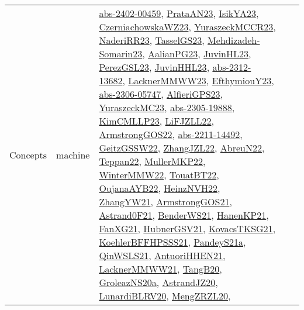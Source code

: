 {\begin{longtable}{lp{3cm}>{\raggedright}p{6cm}>{\raggedright}p{6cm}p{8cm}}
Concepts & machine & \href{articles/abs-2402-00459.pdf}{abs-2402-00459}\cite{abs-2402-00459}, \href{articles/PrataAN23.pdf}{PrataAN23}\cite{PrataAN23}, \href{articles/IsikYA23.pdf}{IsikYA23}\cite{IsikYA23}, \href{articles/CzerniachowskaWZ23.pdf}{CzerniachowskaWZ23}\cite{CzerniachowskaWZ23}, \href{articles/YuraszeckMCCR23.pdf}{YuraszeckMCCR23}\cite{YuraszeckMCCR23}, \href{articles/NaderiRR23.pdf}{NaderiRR23}\cite{NaderiRR23}, \href{papers/TasselGS23.pdf}{TasselGS23}\cite{TasselGS23}, \href{papers/Mehdizadeh-Somarin23.pdf}{Mehdizadeh-Somarin23}\cite{Mehdizadeh-Somarin23}, \href{papers/AalianPG23.pdf}{AalianPG23}\cite{AalianPG23}, \href{papers/JuvinHL23.pdf}{JuvinHL23}\cite{JuvinHL23}, \href{papers/PerezGSL23.pdf}{PerezGSL23}\cite{PerezGSL23}, \href{papers/JuvinHHL23.pdf}{JuvinHHL23}\cite{JuvinHHL23}, \href{articles/abs-2312-13682.pdf}{abs-2312-13682}\cite{abs-2312-13682}, \href{articles/LacknerMMWW23.pdf}{LacknerMMWW23}\cite{LacknerMMWW23}, \href{papers/EfthymiouY23.pdf}{EfthymiouY23}\cite{EfthymiouY23}, \href{articles/abs-2306-05747.pdf}{abs-2306-05747}\cite{abs-2306-05747}, \href{articles/AlfieriGPS23.pdf}{AlfieriGPS23}\cite{AlfieriGPS23}, \href{papers/YuraszeckMC23.pdf}{YuraszeckMC23}\cite{YuraszeckMC23}, \href{articles/abs-2305-19888.pdf}{abs-2305-19888}\cite{abs-2305-19888}, \href{papers/KimCMLLP23.pdf}{KimCMLLP23}\cite{KimCMLLP23}, \href{papers/LiFJZLL22.pdf}{LiFJZLL22}\cite{LiFJZLL22}, \href{papers/ArmstrongGOS22.pdf}{ArmstrongGOS22}\cite{ArmstrongGOS22}, \href{articles/abs-2211-14492.pdf}{abs-2211-14492}\cite{abs-2211-14492}, \href{papers/GeitzGSSW22.pdf}{GeitzGSSW22}\cite{GeitzGSSW22}, \href{papers/ZhangJZL22.pdf}{ZhangJZL22}\cite{ZhangJZL22}, \href{articles/AbreuN22.pdf}{AbreuN22}\cite{AbreuN22}, \href{papers/Teppan22.pdf}{Teppan22}\cite{Teppan22}, \href{articles/MullerMKP22.pdf}{MullerMKP22}\cite{MullerMKP22}, \href{papers/WinterMMW22.pdf}{WinterMMW22}\cite{WinterMMW22}, \href{papers/TouatBT22.pdf}{TouatBT22}\cite{TouatBT22}, \href{papers/OujanaAYB22.pdf}{OujanaAYB22}\cite{OujanaAYB22}, \href{articles/HeinzNVH22.pdf}{HeinzNVH22}\cite{HeinzNVH22}, \href{articles/ZhangYW21.pdf}{ZhangYW21}\cite{ZhangYW21}, \href{papers/ArmstrongGOS21.pdf}{ArmstrongGOS21}\cite{ArmstrongGOS21}, \href{papers/Astrand0F21.pdf}{Astrand0F21}\cite{Astrand0F21}, \href{papers/BenderWS21.pdf}{BenderWS21}\cite{BenderWS21}, \href{papers/HanenKP21.pdf}{HanenKP21}\cite{HanenKP21}, \href{articles/FanXG21.pdf}{FanXG21}\cite{FanXG21}, \href{articles/HubnerGSV21.pdf}{HubnerGSV21}\cite{HubnerGSV21}, \href{papers/KovacsTKSG21.pdf}{KovacsTKSG21}\cite{KovacsTKSG21}, \href{articles/KoehlerBFFHPSSS21.pdf}{KoehlerBFFHPSSS21}\cite{KoehlerBFFHPSSS21}, \href{articles/PandeyS21a.pdf}{PandeyS21a}\cite{PandeyS21a}, \href{articles/QinWSLS21.pdf}{QinWSLS21}\cite{QinWSLS21}, \href{papers/AntuoriHHEN21.pdf}{AntuoriHHEN21}\cite{AntuoriHHEN21}, \href{papers/LacknerMMWW21.pdf}{LacknerMMWW21}\cite{LacknerMMWW21}, \href{papers/TangB20.pdf}{TangB20}\cite{TangB20}, \href{papers/GroleazNS20a.pdf}{GroleazNS20a}\cite{GroleazNS20a}, \href{articles/AstrandJZ20.pdf}{AstrandJZ20}\cite{AstrandJZ20}, \href{articles/LunardiBLRV20.pdf}{LunardiBLRV20}\cite{LunardiBLRV20}, \href{articles/MengZRZL20.pdf}{MengZRZL20}\cite{MengZRZL20}, 
\end{longtable}}
